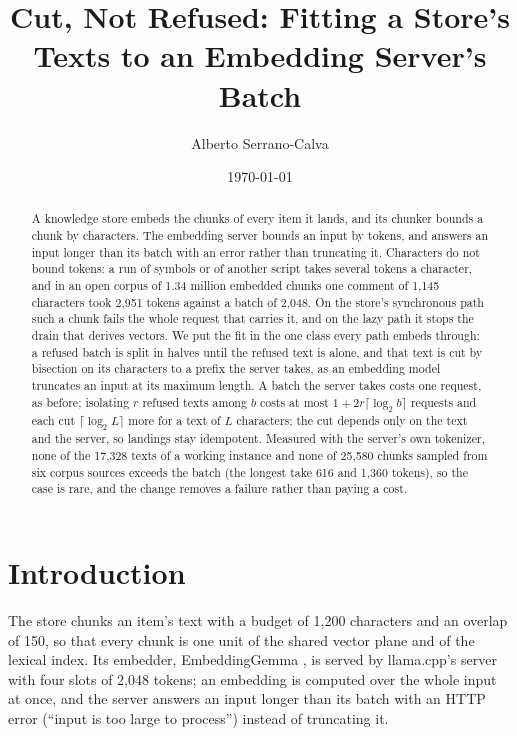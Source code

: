 \documentclass[11pt]{article}
\title{Cut, Not Refused: Fitting a Store's Texts to an Embedding Server's Batch}
\author{Alberto Serrano-Calva}
\date{\today}
\theoremstyle{plain}
\theoremstyle{remark}
\begin{document}
\maketitle

\begin{abstract}
A knowledge store embeds the chunks of every item it lands, and its chunker bounds a chunk by
characters. The embedding server bounds an input by tokens, and answers an input longer than its
batch with an error rather than truncating it. Characters do not bound tokens: a run of symbols or
of another script takes several tokens a character, and in an open corpus of 1.34 million
embedded chunks one comment of 1{,}145 characters took 2{,}951 tokens against a batch of 2{,}048.
On the store's synchronous path such a chunk fails the whole request that carries it, and on the
lazy path it stops the drain that derives vectors. We put the fit in the one class every path
embeds through: a refused batch is split in halves until the refused text is alone, and that text
is cut by bisection on its characters to a prefix the server takes, as an embedding model
truncates an input at its maximum length. A batch the server takes costs one request, as before;
isolating $r$ refused texts among $b$ costs at most $1 + 2r\lceil\log_2 b\rceil$ requests and each
cut $\lceil\log_2 L\rceil$ more for a text of $L$ characters; the cut depends only on the text and
the server, so landings stay idempotent. Measured with the server's own tokenizer, none of the
17{,}328 texts of a working instance and none of 25{,}580 chunks sampled from six corpus sources
exceeds the batch (the longest take 616 and 1{,}360 tokens), so the case is rare, and the change
removes a failure rather than paying a cost.
\end{abstract}

\section{Introduction}

The store chunks an item's text with a budget of 1{,}200 characters and an overlap of 150, so that
every chunk is one unit of the shared vector plane and of the lexical index. Its embedder,
EmbeddingGemma \citep{vera2025embeddinggemma}, is served by llama.cpp's server
\citep{gerganov2023llamacpp} with four slots of 2{,}048 tokens; an embedding is computed over the
whole input at once, and the server answers an input longer than its batch with an HTTP error
(``input is too large to process'') instead of truncating it.
\end{document}
